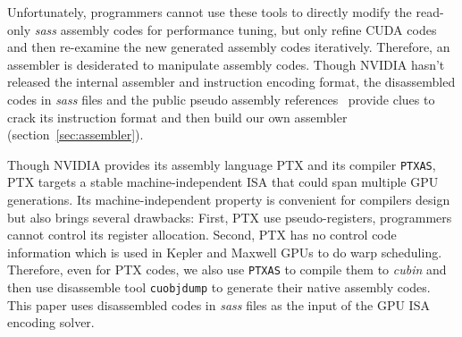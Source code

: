 Unfortunately, programmers cannot use these tools to directly modify the read-only {\em sass} assembly codes for performance tuning, but only refine CUDA codes and then re-examine the new generated assembly codes iteratively.
Therefore, an assembler is desiderated to manipulate assembly codes. 
Though NVIDIA hasn't released the internal assembler and instruction encoding format, the disassembled codes in {\em sass} files and the public pseudo assembly references~\cite{ptx2015isa} provide clues to crack its instruction format and then build our own assembler (section~\ref{sec:assembler}).


Though NVIDIA provides its assembly language PTX and its compiler {\tt PTXAS}, PTX targets a stable machine-independent ISA that could span multiple GPU generations.
Its machine-independent property is convenient for compilers design but also brings several drawbacks:
First, PTX use pseudo-registers, programmers cannot control its register allocation. 
Second, PTX has no control code information which is used in Kepler and Maxwell GPUs to do warp scheduling.
Therefore, even for PTX codes, we also use {\tt PTXAS} to compile them to \emph{cubin} and then use disassemble tool {\tt cuobjdump} to generate their native assembly codes. 
This paper uses disassembled codes in {\em sass} files as the input of the GPU ISA encoding solver.
